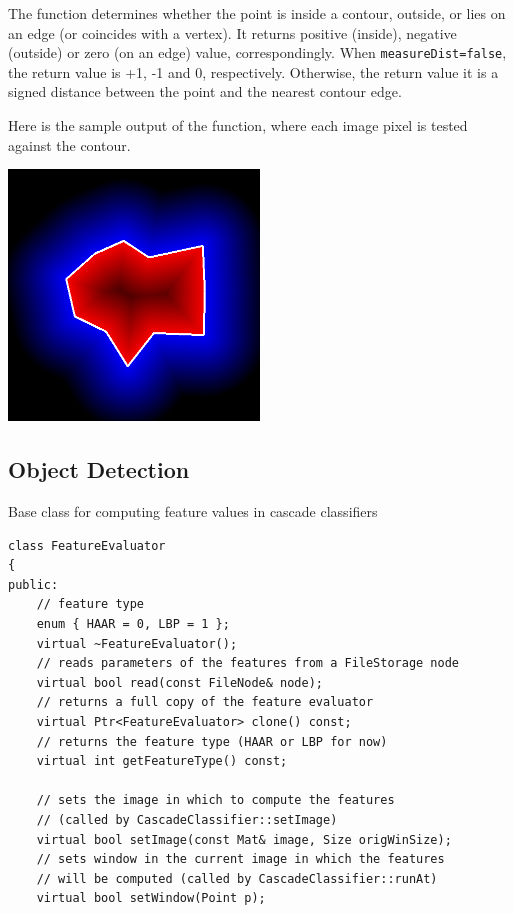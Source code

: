 \begin{description}
The function determines whether the
point is inside a contour, outside, or lies on an edge (or coincides
with a vertex). It returns positive (inside), negative (outside) or zero (on an edge) value,
correspondingly. When \texttt{measureDist=false}, the return value
is +1, -1 and 0, respectively. Otherwise, the return value
it is a signed distance between the point and the nearest contour
edge.

Here is the sample output of the function, where each image pixel is tested against the contour.

\includegraphics[width=0.5\textwidth]{pics/pointpolygon.png}

\subsection{Object Detection}

\label{FeatureEvaluator}
Base class for computing feature values in cascade classifiers

\begin{lstlisting}
class FeatureEvaluator
{
public:    
    // feature type
    enum { HAAR = 0, LBP = 1 };
    virtual ~FeatureEvaluator();
    // reads parameters of the features from a FileStorage node
    virtual bool read(const FileNode& node);
    // returns a full copy of the feature evaluator
    virtual Ptr<FeatureEvaluator> clone() const;
    // returns the feature type (HAAR or LBP for now)
    virtual int getFeatureType() const;
    
    // sets the image in which to compute the features
    // (called by CascadeClassifier::setImage) 
    virtual bool setImage(const Mat& image, Size origWinSize);
    // sets window in the current image in which the features
    // will be computed (called by CascadeClassifier::runAt)
    virtual bool setWindow(Point p);


\end{lstlisting}
\end{description}
